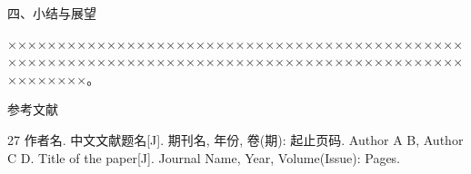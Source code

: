 \documentclass[12pt,a4paper,fontset=fandol]{ctexart}
\newcommand{\hone}[1]{%
  \par\vspace{2\baselineskip}%
  {\centering\heiti\zihao{3}#1\par}%
  \vspace{1.4\baselineskip}}
\begin{document}
\hone{四、小结与展望}

××××××××××××××××××××××××××××××××××××××××××××××××××××××××××××××××××××××××××××××××××××××××××××××××××××。

\hone{参考文献}

\begingroup
\renewcommand{\section}[2]{}%
\begin{thebibliography}{27}
 作者名. 中文文献题名[J]. 期刊名, 年份, 卷(期): 起止页码.
 Author A B, Author C D. Title of the paper[J]. Journal Name, Year, Volume(Issue): Pages.
\end{thebibliography}
\endgroup
\end{document}
